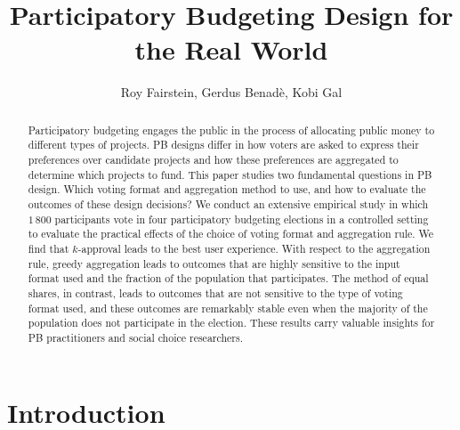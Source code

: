 \documentclass[runningheads]{llncs}
\begin{document}
%
\title{Participatory Budgeting  Design for the Real World}
%
%

\author {
    Roy Fairstein,
    Gerdus Benad\`e,
    Kobi Gal
}


%
%
\maketitle              %
%
\begin{abstract}
Participatory budgeting   engages     the public in the process of allocating  public money to different types of projects. 
  PB designs  differ in how voters are asked to express their preferences over candidate projects and how these preferences are aggregated to determine which projects to fund. 
  This paper studies  two fundamental questions in PB design. Which voting format and aggregation method to use, and how to evaluate the outcomes of these design decisions?
  We conduct an extensive empirical study in which $1\,800$ participants vote in four participatory budgeting elections in a controlled setting to evaluate the practical effects of the choice of voting format and aggregation rule. 
We find that $k$-approval leads to the best user experience. 
With respect to the aggregation rule, greedy aggregation leads to outcomes that are  highly sensitive to   the input format used and the fraction of the population that participates. The method of equal shares, in contrast, leads to outcomes that are not sensitive to the type of voting format used, and these outcomes are remarkably stable even when the majority of the population does not participate in the election.  These results carry valuable insights for PB practitioners and social choice researchers.

\end{abstract}
%
%



\section{Introduction}\label{sec:intro}
\end{document}
